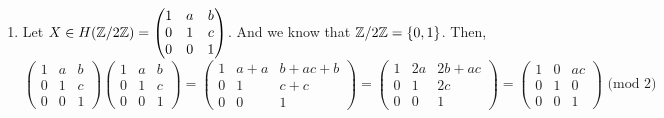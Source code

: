 \documentclass[12pt]{article}
\begin{document}
\begin{solution}
\begin{enumerate}
        By associativity of $F$, and commutativeness of the multiplicative group operation: 
        \begin{enumerate}
            \item d + a + g = a + g + d 
            \item f + c + i = c + f + i 
            \item h + id + ia + e + af = h + di + e + ai + af + b
        \end{enumerate}
        $\implies (XY)Z = X(YZ) \implies H(F)$ is associative. 

        From subparts 1, 2, and 3, we know that $H(F)$ is associative, and is closed under matrix multiplication, and has inverses for all $X \in H(F)$. It's can also be trivially seen that $I_n \in H(F): a, b, c = 0$. So $H(F)$ is a group. \\ 
        The order of a group is its cardinality. For any $X  \in H(F)$, $X$ can have any combination of $a, b, c: a, b, c \in F$. If the order of the $F$ is $\mid F \mid$ then $a, b, c$ can each have $\mid F \mid$ possible values ($\mid F \mid \cdot \mid F \mid \cdot \mid F \mid$). So the order of $\mid H(F) \mid = \mid F \mid ^3$. 

        \item Let $X \in H(\mathbb Z /2 \mathbb Z) =  \begin{pmatrix}
            1 & a & b \\ 0 & 1 & c \\ 0 & 0 & 1
        \end{pmatrix} $. And we know that $\mathbb Z/2\mathbb Z = \{0, 1\}$. Then, \\ 
        \[\begin{pmatrix}
            1 & a & b \\ 0 & 1 & c \\ 0 & 0 & 1
        \end{pmatrix}\begin{pmatrix}
            1 & a & b \\ 0 & 1 & c \\ 0 & 0 & 1
        \end{pmatrix} = \begin{pmatrix}
            1 & a + a & b + ac + b \\ 0 & 1 & c + c \\ 0 & 0 & 1
        \end{pmatrix} = \begin{pmatrix}
            1 & 2a & 2b + ac \\ 0 & 1 & 2c \\ 0 & 0 & 1
        \end{pmatrix} = \begin{pmatrix}
            1 & 0 & ac \\ 0 & 1 & 0 \\ 0 & 0 & 1
        \end{pmatrix} \text{ (mod 2)}\]


\end{enumerate}
\end{solution}
\end{document}
